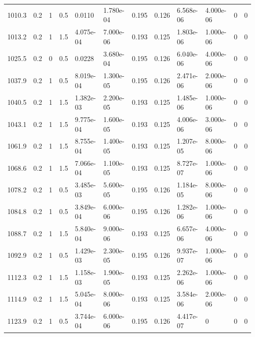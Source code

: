 \documentclass[preview]{standalone}
\begin{document}
{{{\begin{tabular}{L{1.2cm}C{1.2cm} C{0.3cm}C{0.5cm} C{1.4cm}C{1.4cm} C{1.4cm}C{1.4cm} C{1.6cm}C{1.6cm} C{1.6cm}C{1.6cm}}
  1010.3  &   0.2  & 1     & 0.5 &  0.0110  & 1.780e-04  &  0.195&   0.126& 6.568e-06 & 4.000e-06   &  0 & 0  \\ 
  1013.2  &   0.2  & 1     & 1.5 &  4.075e-04  & 7.000e-06  &  0.193&   0.125& 1.803e-06 & 1.000e-06   &  0 & 0  \\ 
  1025.5  &   0.2  & 0     & 0.5 &  0.0228  & 3.680e-04  &  0.195&   0.126& 6.040e-06 & 4.000e-06   &  0 & 0  \\ 
  1037.9  &   0.2  & 1     & 0.5 &  8.019e-04  & 1.300e-05  &  0.195&   0.126& 2.471e-06 & 2.000e-06   &  0 & 0  \\ 
  1040.5  &   0.2  & 1     & 1.5 &  1.382e-03  & 2.200e-05  &  0.193&   0.125& 1.485e-06 & 1.000e-06   &  0 & 0  \\ 
  1043.1  &   0.2  & 1     & 1.5 &  9.775e-04  & 1.600e-05  &  0.193&   0.125& 4.006e-06 & 3.000e-06   &  0 & 0  \\ 
  1061.9  &   0.2  & 1     & 1.5 &  8.755e-04  & 1.400e-05  &  0.193&   0.125& 1.207e-05 & 8.000e-06   &  0 & 0  \\ 
  1068.6  &   0.2  & 1     & 1.5 &  7.066e-04  & 1.100e-05  &  0.193&   0.125& 8.727e-07 & 1.000e-06   &  0 & 0  \\ 
  1078.2  &   0.2  & 1     & 0.5 &  3.485e-03  & 5.600e-05  &  0.195&   0.126& 1.184e-05 & 8.000e-06   &  0 & 0  \\ 
  1084.8  &   0.2  & 1     & 0.5 &  3.849e-04  & 6.000e-06  &  0.195&   0.126& 1.282e-06 & 1.000e-06   &  0 & 0  \\ 
  1088.7  &   0.2  & 1     & 1.5 &  5.840e-04  & 9.000e-06  &  0.193&   0.125& 6.657e-06 & 4.000e-06   &  0 & 0  \\ 
  1092.9  &   0.2  & 1     & 0.5 &  1.429e-03  & 2.300e-05  &  0.195&   0.126& 9.937e-07 & 1.000e-06   &  0 & 0  \\ 
  1112.3  &   0.2  & 1     & 1.5 &  1.158e-03  & 1.900e-05  &  0.193&   0.125& 2.262e-06 & 1.000e-06   &  0 & 0  \\ 
  1114.9  &   0.2  & 1     & 1.5 &  5.045e-04  & 8.000e-06  &  0.193&   0.125& 3.584e-06 & 2.000e-06   &  0 & 0  \\ 
  1123.9  &   0.2  & 1     & 0.5 &  3.744e-04  & 6.000e-06  &  0.195&   0.126& 4.417e-07 & 0   &  0 & 0  \\ 
\hline 
\end{tabular} 

}}}
\end{document}
